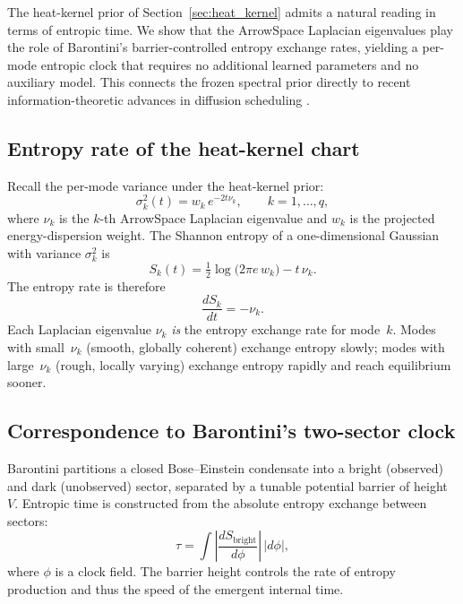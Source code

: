 \documentclass[11pt]{article}
\begin{document}
The heat-kernel prior of Section~\ref{sec:heat_kernel} admits a natural
reading in terms of entropic time. We show that the ArrowSpace Laplacian
eigenvalues play the role of Barontini's barrier-controlled entropy exchange
rates, yielding a per-mode entropic clock that requires no additional learned
parameters and no auxiliary model. This connects the frozen spectral prior
directly to recent information-theoretic advances in diffusion scheduling \cite{Stancevic2025}.

\subsection{Entropy rate of the heat-kernel chart}
\label{sec:entropy_rate}

Recall the per-mode variance under the heat-kernel prior:
\[\sigma_k^2(t) = w_k \, e^{-2t\nu_k}, \qquad k = 1,\ldots,q,\]
where \(\nu_k\) is the \(k\)-th ArrowSpace Laplacian eigenvalue and \(w_k\)
is the projected energy-dispersion weight. The Shannon entropy of a
one-dimensional Gaussian with variance \(\sigma_k^2\) is
\[S_k(t) = \tfrac{1}{2}\log\!\bigl(2\pi e\, w_k\bigr) - t\,\nu_k.\]
The entropy rate is therefore
\[\boxed{\frac{dS_k}{dt} = -\nu_k.}\]
Each Laplacian eigenvalue \(\nu_k\) \emph{is} the entropy exchange rate for
mode~\(k\). Modes with small~\(\nu_k\) (smooth, globally coherent) exchange
entropy slowly; modes with large~\(\nu_k\) (rough, locally varying) exchange
entropy rapidly and reach equilibrium sooner.

\subsection{Correspondence to Barontini's two-sector clock}
\label{sec:barontini_mapping}

Barontini partitions a closed Bose--Einstein condensate into a bright
(observed) and dark (unobserved) sector, separated by a tunable potential
barrier of height~\(V\). Entropic time is constructed from the absolute
entropy exchange between sectors:
\[\tau = \int \left|\frac{dS_{\mathrm{bright}}}{d\phi}\right| \,|d\phi|,\]
where \(\phi\) is a clock field. The barrier height controls the rate of
entropy production and thus the speed of the emergent internal time.
\end{document}
